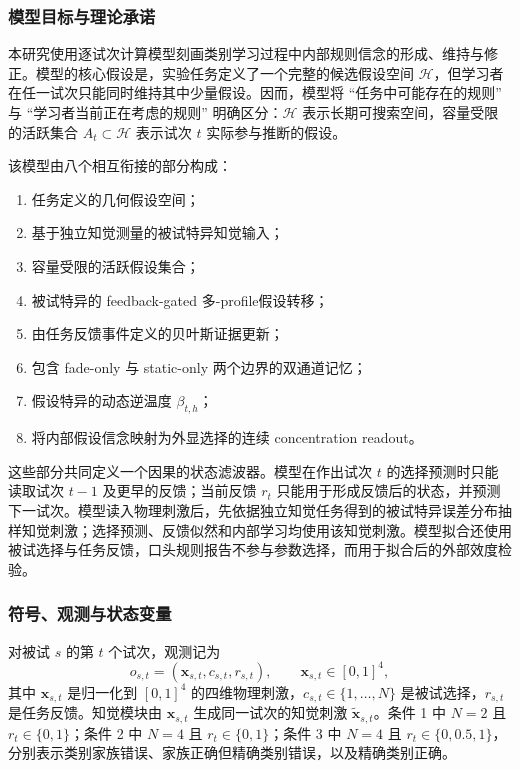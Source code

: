 
\subsubsection{模型目标与理论承诺}

本研究使用逐试次计算模型刻画类别学习过程中内部规则信念的形成、维持与修正。模型的核心假设是，实验任务定义了一个完整的候选假设空间 $\mathcal H$，但学习者在任一试次只能同时维持其中少量假设。因而，模型将 ``任务中可能存在的规则'' 与 ``学习者当前正在考虑的规则'' 明确区分：$\mathcal H$ 表示长期可搜索空间，容量受限的活跃集合 $A_t\subset\mathcal H$ 表示试次 $t$ 实际参与推断的假设。

该模型由八个相互衔接的部分构成：
\begin{enumerate}
    \item 任务定义的几何假设空间；
    \item 基于独立知觉测量的被试特异知觉输入；
    \item 容量受限的活跃假设集合；
    \item 被试特异的 feedback-gated 多-profile假设转移；
    \item 由任务反馈事件定义的贝叶斯证据更新；
    \item 包含 fade-only 与 static-only 两个边界的双通道记忆；
    \item 假设特异的动态逆温度 $\beta_{t,h}$；
    \item 将内部假设信念映射为外显选择的连续 concentration readout。
\end{enumerate}
这些部分共同定义一个因果的状态滤波器。模型在作出试次 $t$ 的选择预测时只能读取试次 $t-1$ 及更早的反馈；当前反馈 $r_t$ 只能用于形成反馈后的状态，并预测下一试次。模型读入物理刺激后，先依据独立知觉任务得到的被试特异误差分布抽样知觉刺激；选择预测、反馈似然和内部学习均使用该知觉刺激。模型拟合还使用被试选择与任务反馈，口头规则报告不参与参数选择，而用于拟合后的外部效度检验。


\subsubsection{符号、观测与状态变量}

对被试 $s$ 的第 $t$ 个试次，观测记为
\begin{equation}
    o_{s,t}=(\mathbf x_{s,t},c_{s,t},r_{s,t}),
    \qquad
    \mathbf x_{s,t}\in[0,1]^4 ,
    \label{eq:modelv2-observation}
\end{equation}
其中 $\mathbf x_{s,t}$ 是归一化到 $[0,1]^4$ 的四维物理刺激，$c_{s,t}\in\{1,\ldots,N\}$ 是被试选择，$r_{s,t}$ 是任务反馈。知觉模块由 $\mathbf x_{s,t}$ 生成同一试次的知觉刺激 $\widetilde{\mathbf x}_{s,t}$。条件 1 中 $N=2$ 且 $r_t\in\{0,1\}$；条件 2 中 $N=4$ 且 $r_t\in\{0,1\}$；条件 3 中 $N=4$ 且 $r_t\in\{0,0.5,1\}$，分别表示类别家族错误、家族正确但精确类别错误，以及精确类别正确。

